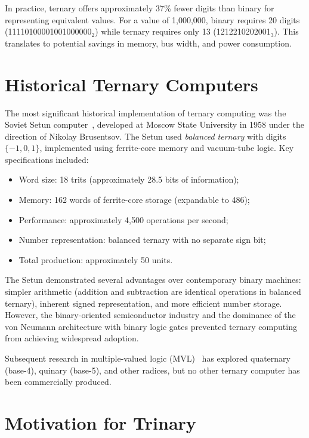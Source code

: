 \documentclass[10pt,a4paper,twoside]{book}
\begin{document}
In practice, ternary offers approximately 37\% fewer digits than binary for representing
equivalent values. For a value of 1,000,000, binary requires 20 digits
(11110100001001000000$_2$) while ternary requires only 13 (1212210202001$_3$). This
translates to potential savings in memory, bus width, and power consumption.

\section{Historical Ternary Computers}

The most significant historical implementation of ternary computing was the Soviet Setun
computer~\cite{brusentsov1965setun}, developed at Moscow State University in 1958 under
the direction of Nikolay Brusentsov. The Setun used \emph{balanced ternary} with digits
$\{-1,0,1\}$, implemented using ferrite-core memory and vacuum-tube logic. Key
specifications included:

\begin{itemize}
    \item Word size: 18 trits (approximately 28.5 bits of information);
    \item Memory: 162 words of ferrite-core storage (expandable to 486);
    \item Performance: approximately 4,500 operations per second;
    \item Number representation: balanced ternary with no separate sign bit;
    \item Total production: approximately 50 units.
\end{itemize}

The Setun demonstrated several advantages over contemporary binary machines: simpler
arithmetic (addition and subtraction are identical operations in balanced ternary),
inherent signed representation, and more efficient number storage. However, the
binary-oriented semiconductor industry and the dominance of the von Neumann architecture
with binary logic gates prevented ternary computing from achieving widespread adoption.

Subsequent research in multiple-valued logic (MVL)~\cite{smith1997mvl} has explored
quaternary (base-4), quinary (base-5), and other radices, but no other ternary computer
has been commercially produced.

\section{Motivation for Trinary}
\end{document}
